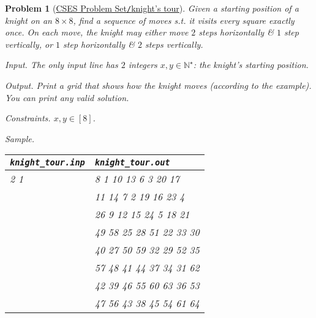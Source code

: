 \documentclass{article}
\newtheorem{problem}{Problem}
\begin{document}
\begin{problem}[\href{https://cses.fi/problemset/task/1689}{CSES Problem Set{\tt/}knight's tour}]
    Given a starting position of a knight on an $8\times8$, find a sequence of moves s.t. it visits every square exactly once. On each move, the knight may either move $2$ steps horizontally \& $1$ step vertically, or $1$ step horizontally \& $2$ steps vertically.
    \item {\sf Input.} The only input line has $2$ integers $x,y\in\mathbb{N}^\star$: the knight's starting position.
    \item {\sf Output.} Print a grid that shows how the knight moves (according to the example). You can print any valid solution.
    \item {\sf Constraints.} $x,y\in[8]$.
    \item {\sf Sample.}
    \begin{table}[H]
        \centering
        \begin{tabular}{|l|l|}
            \hline
            \verb|knight_tour.inp| & \verb|knight_tour.out| \\
            \hline
            2 1 & 8 1 10 13 6 3 20 17 \\
            & 11 14 7 2 19 16 23 4 \\
            & 26 9 12 15 24 5 18 21 \\
            & 49 58 25 28 51 22 33 30 \\
            & 40 27 50 59 32 29 52 35 \\
            & 57 48 41 44 37 34 31 62 \\
            & 42 39 46 55 60 63 36 53 \\
            & 47 56 43 38 45 54 61 64 \\
            \hline
        \end{tabular}
    \end{table}
\end{problem}
\end{document}
